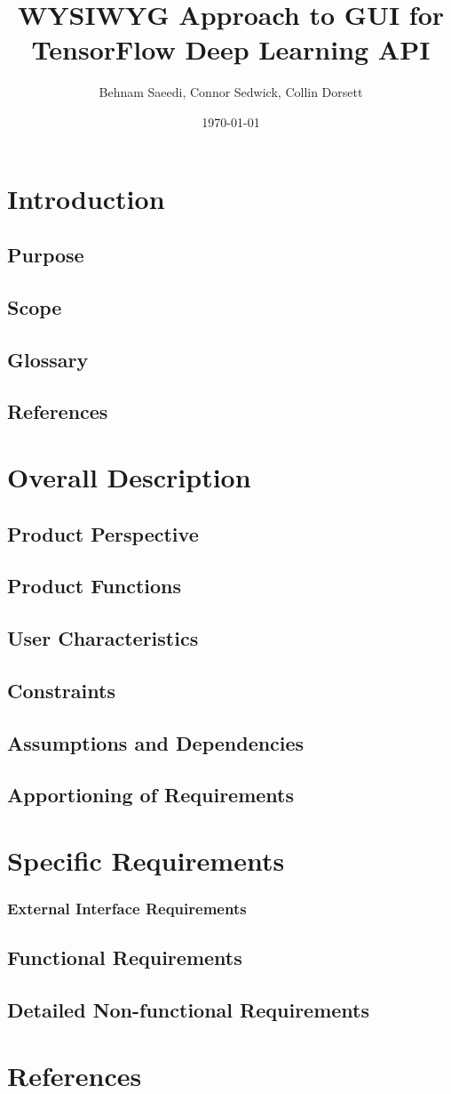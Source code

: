 \documentclass[a4paper,10pt]{article} \usepackage[margin=1.0in]{geometry} \usepackage{pdfpages} \usepackage{graphicx}
\title{WYSIWYG Approach to GUI for TensorFlow Deep Learning API}
\author{Behnam Saeedi, Connor Sedwick, Collin Dorsett}
\date{\today}
\begin{document}
\maketitle
\newpage
\tableofcontents
\newpage
\section{Introduction}
\subsection{Purpose}
\subsection{Scope}
\subsection{Glossary}
\subsection{References}
\newpage

\section{Overall Description}
\subsection{Product Perspective}
\subsection{Product Functions}
\subsection{User Characteristics}
\subsection{Constraints}
\subsection{Assumptions and Dependencies}
\subsection{Apportioning of Requirements}
\newpage

\section{Specific Requirements}
\subsubsection{External Interface Requirements}
\subsection{Functional Requirements}
\subsection{Detailed Non-functional Requirements}
\newpage
\section{References}
\newpage
\end{document}
